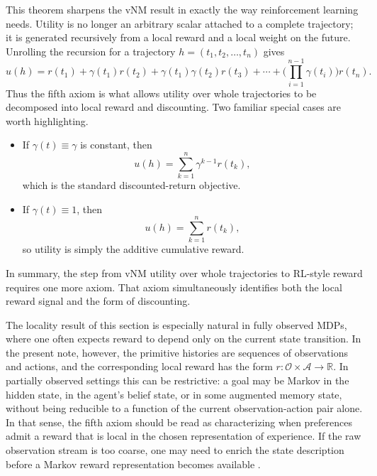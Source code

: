\documentclass[11pt]{article}
\newcommand{\Ofin}{\mathcal{O}}
\newcommand{\Afin}{\mathcal{A}}
\newcommand{\R}{\mathbb{R}}
\begin{document}
This theorem sharpens the vNM result in exactly the way reinforcement learning
needs. Utility is no longer an arbitrary scalar attached to a complete
trajectory; it is generated recursively from a local reward and a local weight
on the future. Unrolling the recursion for a trajectory
$h=(t_1,t_2,\dots,t_n)$ gives
\[
u(h)=r(t_1)+\gamma(t_1)r(t_2)+\gamma(t_1)\gamma(t_2)r(t_3)+\cdots+
\Bigg(\prod_{i=1}^{n-1}\gamma(t_i)\Bigg)r(t_n).
\]
Thus the fifth axiom is what allows utility over whole trajectories to be
decomposed into local reward and discounting. Two familiar special cases are worth highlighting. 
\begin{itemize}
		
\item If
$\gamma(t)\equiv \gamma$ is constant, then
\[
u(h)=\sum_{k=1}^n \gamma^{k-1} r(t_k),
\]
which is the standard discounted-return objective. 
\item If
$\gamma(t)\equiv 1$, then
\[
u(h)=\sum_{k=1}^n r(t_k),
\]
so utility is simply the additive cumulative reward. 
\end{itemize}

In summary, the step from vNM utility over whole trajectories to RL-style reward
requires one more axiom. That axiom simultaneously identifies both the local
reward signal and the form of discounting.

\begin{remark}
The locality result of this section is especially natural in fully
observed MDPs, where one often expects reward to depend only on the current
state transition. In the present note, however, the primitive histories are
sequences of observations and actions, and the corresponding local reward has
the form $r\colon \Ofin\times \Afin\to\R$. In partially observed settings this
can be restrictive: a goal may be Markov in the hidden state, in the agent's
belief state, or in some augmented memory state, without being reducible to a
function of the current observation-action pair alone. In that sense, the fifth
axiom should be read as characterizing when preferences admit a reward that is
local in the chosen representation of experience. If the raw observation stream
is too coarse, one may need to enrich the state description before a Markov
reward representation becomes available \citep{bowling2023settling}.
\end{remark}
\end{document}
